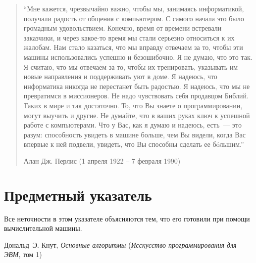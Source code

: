 \documentclass[twoside]{book}%
\begin{document}
\begin{titlepage}
\begin{quote}
``Мне кажется, чрезвычайно важно, чтобы мы, занимаясь
информатикой, получали радость от общения с компьютером.  С самого
начала это было громадным удовольствием. Конечно,
время от времени встревали заказчики, и через какое-то время мы стали
серьезно относиться к их жалобам. Нам стало казаться, что мы
вправду отвечаем за то, чтобы эти машины использовались успешно и безошибочно.
Я не думаю, что это так. Я считаю, что мы
отвечаем за то, чтобы их тренировать, указывать им
новые направления и поддерживать уют в доме. Я надеюсь, что
информатика никогда не перестанет быть радостью. Я надеюсь, что
мы не превратимся в миссионеров. Не надо чувствовать себя
продавцом Библий.  Таких в мире и так достаточно. То, что
Вы знаете о программировании, могут выучить и другие. Не думайте, что 
в ваших руках ключ к успешной работе с компьютерами. Что у Вас, как я
думаю и надеюсь, есть~--- это разум: способность увидеть в машине
больше, чем Вы видели, когда Вас впервые к ней подвели, увидеть, что
Вы способны сделать ее б\'oльшим.''%

Алан Дж. Перлис (1 апреля 1922 -- 7 февраля 1990)
\end{quote}
\end{titlepage}
\pagestyle{headings}
\tableofcontents
\thispagestyle{empty}

\newpage
\pagestyle{headings}







\clearpage

\pagestyle{headings}











\clearpage
\pagestyle{myheadings}

\clearpage

\chapter*{Предметный указатель}
\epigraph{
Все неточности в этом указателе объясняются тем, что его готовили при
помощи вычислительной машины.
}{
Дональд~Э. Кнут, {\it Основные алгоритмы} ({\it Исскусство
  программирования для ЭВМ}, том 1)
}
\end{document}
